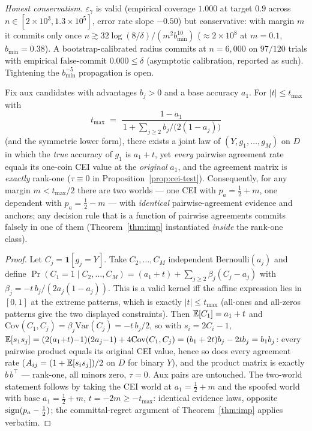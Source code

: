 \noindent\emph{Honest conservatism.} $\varepsilon_\gamma$ is valid (empirical
coverage $1.000$ at target $0.9$ across $n\in[2{\times}10^3,1.3{\times}10^5]$,
error rate slope $-0.50$) but conservative: with margin $m$ it commits only
once $n\gtrsim 32\log(8/\delta)/(m^2b_{\min}^{10})$ ($\approx2\times10^8$ at
$m=0.1$, $b_{\min}=0.38$). A bootstrap-calibrated radius commits at
$n=6{,}000$ on $97/120$ trials with empirical false-commit $0.000\le\delta$
(asymptotic calibration, reported as such). Tightening the
$b_{\min}^{-5}$ propagation is open.

\begin{theorem}\label{thm:invisible-reach}
Fix aux candidates with advantages $b_j>0$ and a base accuracy $a_1$. For
$|t|\le t_{\max}$ with
\[
t_{\max}\;=\;\frac{1-a_1}{\,1+\sum_{j\ge2} b_j/\bigl(2(1-a_j)\bigr)}
\]
(and the symmetric lower form),
there exists a joint law of $(Y,g_1,\dots,g_M)$ on $D$ in which the
\emph{true} accuracy of $g_1$ is $a_1+t$, yet \emph{every} pairwise agreement
rate equals its one-coin CEI value at the \emph{original} $a_1$, and the
agreement matrix is \emph{exactly} rank-one ($\tau\equiv0$ in
Proposition~\ref{prop:cei-test}). Consequently, for any margin
$m<t_{\max}/2$ there are two worlds --- one CEI with $p_a=\tfrac12+m$, one
dependent with $p_a=\tfrac12-m$ --- with \emph{identical} pairwise-agreement
evidence and anchors; any decision rule that is a function of pairwise
agreements commits falsely in one of them
(Theorem~\ref{thm:imp} instantiated \emph{inside} the rank-one class).
\end{theorem}
\begin{proof}
Let $C_j=\mathbf1[g_j{=}Y]$. Take $C_2,\dots,C_M$ independent
Bernoulli$(a_j)$ and define
$\Pr(C_1{=}1\mid C_2,\dots,C_M)=(a_1+t)+\sum_{j\ge2}\beta_j(C_j-a_j)$ with
$\beta_j=-t\,b_j/(2a_j(1-a_j))$. This is a valid kernel iff the affine
expression lies in $[0,1]$ at the extreme patterns, which is exactly
$|t|\le t_{\max}$ (all-ones and all-zeros patterns give the two displayed
constraints). Then $\mathbb{E}[C_1]=a_1+t$ and
$\mathrm{Cov}(C_1,C_j)=\beta_j\mathrm{Var}(C_j)=-t\,b_j/2$, so with
$s_i=2C_i-1$,
$\mathbb{E}[s_1s_j]=(2(a_1{+}t){-}1)(2a_j{-}1)+4\mathrm{Cov}(C_1,C_j)
=(b_1+2t)b_j-2tb_j=b_1b_j$: every pairwise product equals its original CEI
value, hence so does every agreement rate
($A_{ij}=(1+\mathbb{E}[s_is_j])/2$ on $D$ for binary $Y$), and the product matrix is
exactly $b\,b^\top$ --- rank-one, all minors zero, $\tau=0$. Aux pairs are
untouched. The two-world statement follows by taking the CEI world at
$a_1=\tfrac12+m$ and the spoofed world with base $a_1=\tfrac12+m$,
$t=-2m\ge-t_{\max}$: identical evidence laws, opposite $\operatorname{sign}(p_a-\tfrac12)$;
the committal-regret argument of Theorem~\ref{thm:imp} applies verbatim.
\end{proof}

